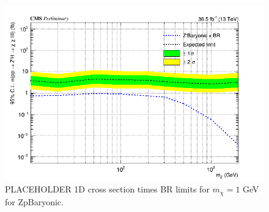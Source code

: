\begin{figure}[tbh]
\centering
\includegraphics[width=5in]{figures/sigma_limits_4mu_ZpBaryonic.png}
\caption{PLACEHOLDER 1D cross section times BR limits for $m_{\chi} = 1$ GeV for ZpBaryonic.}
\label{fig:limzpbaryonic}
\end{figure}


